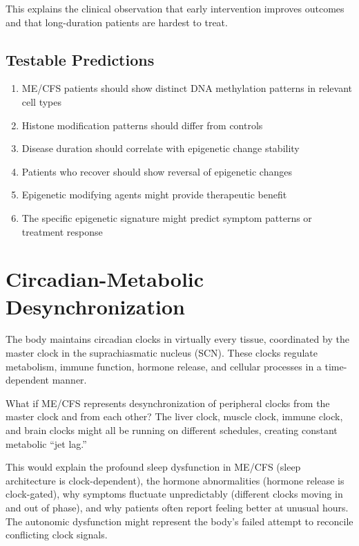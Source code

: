 This explains the clinical observation that early intervention improves outcomes and that long-duration patients are hardest to treat.

\subsection{Testable Predictions}

\begin{enumerate}
    \item ME/CFS patients should show distinct DNA methylation patterns in relevant cell types
    \item Histone modification patterns should differ from controls
    \item Disease duration should correlate with epigenetic change stability
    \item Patients who recover should show reversal of epigenetic changes
    \item Epigenetic modifying agents might provide therapeutic benefit
    \item The specific epigenetic signature might predict symptom patterns or treatment response
\end{enumerate}


\section{Circadian-Metabolic Desynchronization}
\label{sec:circadian-desync}

\begin{open_question}
The body maintains circadian clocks in virtually every tissue, coordinated by the master clock in the suprachiasmatic nucleus (SCN). These clocks regulate metabolism, immune function, hormone release, and cellular processes in a time-dependent manner.

What if ME/CFS represents desynchronization of peripheral clocks from the master clock and from each other? The liver clock, muscle clock, immune clock, and brain clocks might all be running on different schedules, creating constant metabolic ``jet lag.''

This would explain the profound sleep dysfunction in ME/CFS (sleep architecture is clock-dependent), the hormone abnormalities (hormone release is clock-gated), why symptoms fluctuate unpredictably (different clocks moving in and out of phase), and why patients often report feeling better at unusual hours. The autonomic dysfunction might represent the body's failed attempt to reconcile conflicting clock signals.
\end{open_question}

